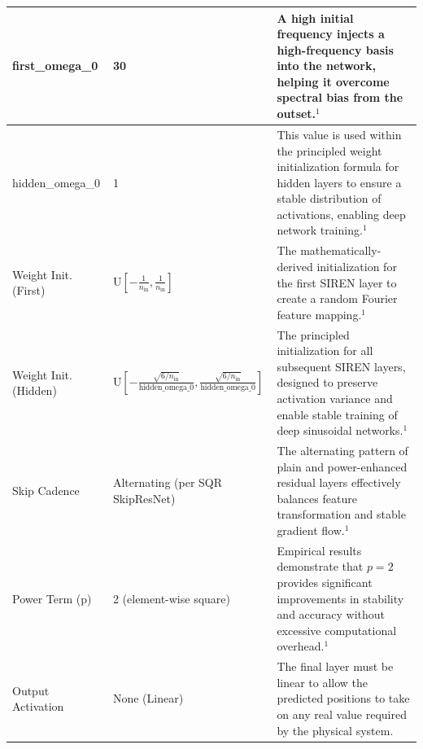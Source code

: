 \begin{longtable}{|p{3cm}|p{5cm}|p{8cm}|}
first\_omega\_0 & 30 & A high initial frequency injects a high-frequency basis into the network, helping it overcome spectral bias from the outset.$^1$ \\
\hline
hidden\_omega\_0 & 1 & This value is used within the principled weight initialization formula for hidden layers to ensure a stable distribution of activations, enabling deep network training.$^1$ \\
\hline
Weight Init. (First) & $\mathrm{U}\left[-\frac{1}{n_{\text{in}}}, \frac{1}{n_{\text{in}}}\right]$ & The mathematically-derived initialization for the first SIREN layer to create a random Fourier feature mapping.$^1$ \\
\hline
Weight Init. (Hidden) & $\mathrm{U}\left[-\frac{\sqrt{6/n_{\text{in}}}}{\text{hidden\_omega\_0}}, \frac{\sqrt{6/n_{\text{in}}}}{\text{hidden\_omega\_0}}\right]$ & The principled initialization for all subsequent SIREN layers, designed to preserve activation variance and enable stable training of deep sinusoidal networks.$^1$ \\
\hline
Skip Cadence & Alternating (per SQR SkipResNet) & The alternating pattern of plain and power-enhanced residual layers effectively balances feature transformation and stable gradient flow.$^1$ \\
\hline
Power Term (p) & 2 (element-wise square) & Empirical results demonstrate that $p=2$ provides significant improvements in stability and accuracy without excessive computational overhead.$^1$ \\
\hline
Output Activation & None (Linear) & The final layer must be linear to allow the predicted positions to take on any real value required by the physical system. \\
\hline
\end{longtable}
\FloatBarrier
